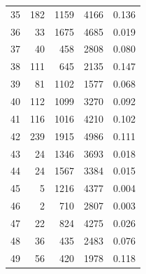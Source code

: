 \begin{tabular}{rrrrr}
35 & 182 & 1159 & 4166 & 0.136 \\
36 & 33 & 1675 & 4685 & 0.019 \\
37 & 40 & 458 & 2808 & 0.080 \\
38 & 111 & 645 & 2135 & 0.147 \\
39 & 81 & 1102 & 1577 & 0.068 \\
40 & 112 & 1099 & 3270 & 0.092 \\
41 & 116 & 1016 & 4210 & 0.102 \\
42 & 239 & 1915 & 4986 & 0.111 \\
43 & 24 & 1346 & 3693 & 0.018 \\
44 & 24 & 1567 & 3384 & 0.015 \\
45 & 5 & 1216 & 4377 & 0.004 \\
46 & 2 & 710 & 2807 & 0.003 \\
47 & 22 & 824 & 4275 & 0.026 \\
48 & 36 & 435 & 2483 & 0.076 \\
49 & 56 & 420 & 1978 & 0.118 \\
\bottomrule
\end{tabular}

